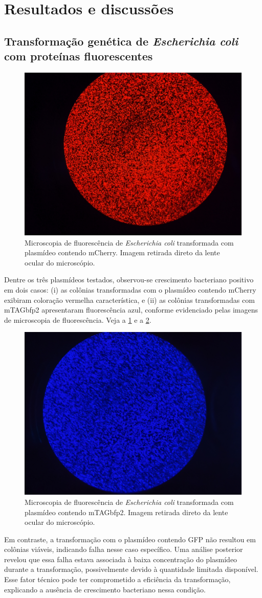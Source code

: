 \newpage
\section{Resultados e discussões}
\subsection{Transformação genética de \textit{Escherichia coli} com proteínas
fluorescentes}
\begin{figure}
    \centering
    \includegraphics[width=.30\textwidth]{fig/red.jpg}
    \caption{Microscopia de fluorescência de \textit{Escherichia coli}
    transformada com plasmídeo contendo mCherry. Imagem retirada direto da lente
    ocular do microscópio.}
    \label{mCherry}
\end{figure}
Dentre os três plasmídeos testados, observou-se crescimento
bacteriano positivo em dois casos: (i) as colônias transformadas com o plasmídeo
contendo mCherry exibiram coloração vermelha característica, e (ii) as colônias
transformadas com mTAGbfp2 apresentaram fluorescência azul, conforme evidenciado
pelas imagens de microscopia de fluorescência. Veja a \cref{mCherry} e a
\cref{mTAG}.

\begin{figure}
    \centering
    \includegraphics[width=.30\textwidth]{fig/blue.jpg}
    \caption{Microscopia de fluorescência de \textit{Escherichia coli}
    transformada com plasmídeo contendo mTAGbfp2. Imagem retirada direto da lente
    ocular do microscópio.}
    \label{mTAG}
\end{figure}

Em contraste, a transformação com o plasmídeo contendo GFP não resultou em
colônias viáveis, indicando falha nesse caso específico. Uma análise posterior
revelou que essa falha estava associada à baixa concentração do plasmídeo
durante a transformação, possivelmente devido à quantidade limitada disponível.
Esse fator técnico pode ter comprometido a eficiência da transformação,
explicando a ausência de crescimento bacteriano nessa condição.

